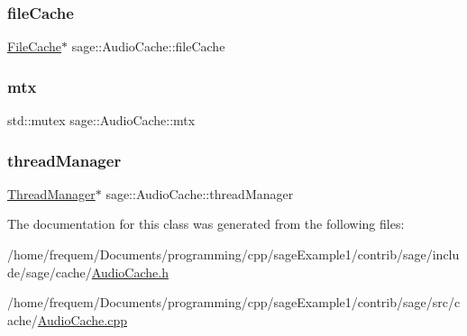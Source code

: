 \subsubsection{\texorpdfstring{fileCache}{fileCache}}
{\footnotesize\ttfamily \mbox{\hyperlink{classsage_1_1FileCache}{File\+Cache}}$\ast$ sage\+::\+Audio\+Cache\+::file\+Cache\hspace{0.3cm}{\ttfamily [private]}}

\mbox{\label{classsage_1_1AudioCache_a94ada12c063660c2fd9a0bc3b27f2bfd}} 
\subsubsection{\texorpdfstring{mtx}{mtx}}
{\footnotesize\ttfamily std\+::mutex sage\+::\+Audio\+Cache\+::mtx\hspace{0.3cm}{\ttfamily [private]}}

\mbox{\label{classsage_1_1AudioCache_a3b9b0b2a42ab08e28fe2e9d4ccbd97b2}} 
\subsubsection{\texorpdfstring{threadManager}{threadManager}}
{\footnotesize\ttfamily \mbox{\hyperlink{classsage_1_1ThreadManager}{Thread\+Manager}}$\ast$ sage\+::\+Audio\+Cache\+::thread\+Manager\hspace{0.3cm}{\ttfamily [private]}}



The documentation for this class was generated from the following files\+:\begin{DoxyCompactItemize}
\item 
/home/frequem/\+Documents/programming/cpp/sage\+Example1/contrib/sage/include/sage/cache/\mbox{\hyperlink{AudioCache_8h}{Audio\+Cache.\+h}}\item 
/home/frequem/\+Documents/programming/cpp/sage\+Example1/contrib/sage/src/cache/\mbox{\hyperlink{AudioCache_8cpp}{Audio\+Cache.\+cpp}}\end{DoxyCompactItemize}
